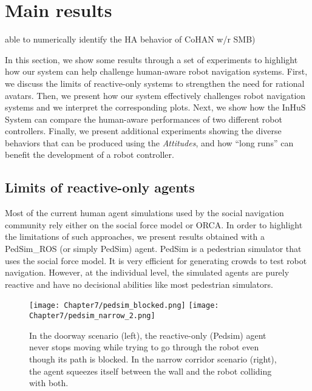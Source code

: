 \section{Main results}
able to numerically identify the HA behavior of CoHAN w/r SMB)


In this section, we show some results through a set of experiments to highlight how our system can help challenge human-aware robot navigation systems. First, we discuss the limits of reactive-only systems to strengthen the need for rational avatars. 
Then, we present how our system effectively challenges robot navigation systems and we interpret the corresponding plots.
Next, we show how the InHuS System can compare the human-aware performances of two different robot controllers.
Finally, we present additional experiments showing the diverse behaviors that can be produced using the \textit{Attitudes}, and how ``long runs'' can benefit the development of a robot controller.

\subsection{Limits of reactive-only agents}
\label{sec:pedsim_compare}
Most of the current human agent simulations used by the social navigation community rely either on the social force model or ORCA. In order to highlight the limitations of such approaches, we present results obtained with a PedSim\_ROS (or simply PedSim) agent. PedSim is a pedestrian simulator that uses the social force model. It is very efficient for generating crowds to test robot navigation. However, at the individual level, the simulated agents are purely reactive and have no decisional abilities like most pedestrian simulators. 

\begin{figure}
    \centering
    \texttt{[image: Chapter7/pedsim\_blocked.png]}
    \texttt{[image: Chapter7/pedsim\_narrow\_2.png]}
    \caption{
    In the doorway scenario (left), the reactive-only (Pedsim) agent never stops moving while trying to go through the robot even though its path is blocked. 
    In the narrow corridor scenario (right), the agent squeezes itself between the wall and the robot colliding with both. 
    }
    \label{fig:limits_reactive}
    \vspace{-0.3cm}
\end{figure}

